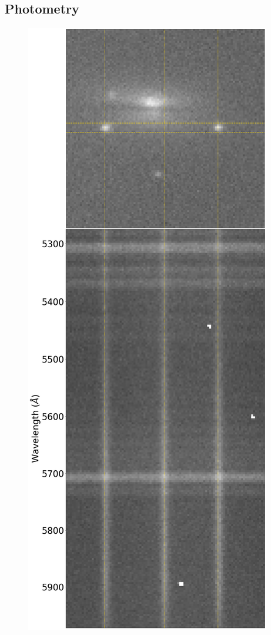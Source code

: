 \documentclass[a4paper,oneside,12pt, class=Latex/Classes/PhDthesisPSnPDF, crop=false]{standalone}
\begin{document}
\subsection{Photometry}
\begin{figure}
    \centering
    \includegraphics[height=0.83\textheight]{../Images/chapter_2/phot_and_spec_example.png}

\end{figure}
\end{document}
